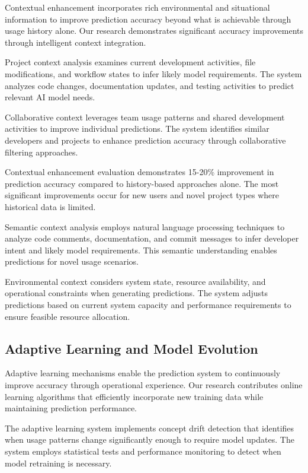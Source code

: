 Contextual enhancement incorporates rich environmental and situational information to improve prediction accuracy beyond what is achievable through usage history alone. Our research demonstrates significant accuracy improvements through intelligent context integration.

Project context analysis examines current development activities, file modifications, and workflow states to infer likely model requirements. The system analyzes code changes, documentation updates, and testing activities to predict relevant AI model needs.

Collaborative context leverages team usage patterns and shared development activities to improve individual predictions. The system identifies similar developers and projects to enhance prediction accuracy through collaborative filtering approaches.

\begin{successbox}
Contextual enhancement evaluation demonstrates 15-20\% improvement in prediction accuracy compared to history-based approaches alone. The most significant improvements occur for new users and novel project types where historical data is limited.
\end{successbox}

Semantic context analysis employs natural language processing techniques to analyze code comments, documentation, and commit messages to infer developer intent and likely model requirements. This semantic understanding enables predictions for novel usage scenarios.

Environmental context considers system state, resource availability, and operational constraints when generating predictions. The system adjusts predictions based on current system capacity and performance requirements to ensure feasible resource allocation.

\subsection*{Adaptive Learning and Model Evolution}

Adaptive learning mechanisms enable the prediction system to continuously improve accuracy through operational experience. Our research contributes online learning algorithms that efficiently incorporate new training data while maintaining prediction performance.

The adaptive learning system implements concept drift detection that identifies when usage patterns change significantly enough to require model updates. The system employs statistical tests and performance monitoring to detect when model retraining is necessary.

